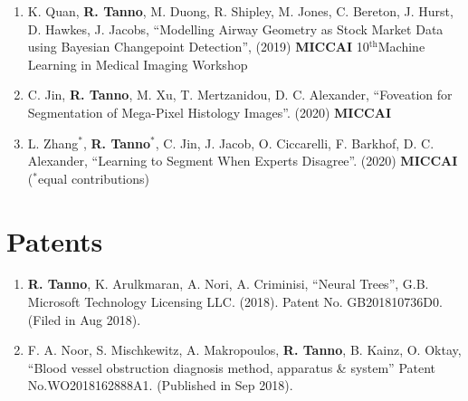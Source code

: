 \begin{enumerate}
	\item K. Quan, \textbf{R. Tanno}, M. Duong, R. Shipley, M. Jones, C. Bereton, J. Hurst, D. Hawkes, J. Jacobs, 	``Modelling Airway Geometry as Stock Market Data using Bayesian Changepoint Detection'', (2019) \textbf{MICCAI} 10$^{\text{th}}$Machine Learning in Medical Imaging Workshop

\item C. Jin, \textbf{R. Tanno}, M. Xu, T. Mertzanidou, D. C. Alexander, ``Foveation for Segmentation of Mega-Pixel Histology Images''.  (2020) \textbf{MICCAI} 

\item L. Zhang$^*$, \textbf{R. Tanno}$^*$,  C. Jin, J. Jacob, O. Ciccarelli, F. Barkhof, D. C. Alexander, ``Learning to Segment When Experts Disagree''.  (2020) \textbf{MICCAI} ($^*$equal contributions)

\end{enumerate}

\vspace{-2mm}
\section*{Patents}
\begin{enumerate}
	\item  \textbf{R. Tanno}, K. Arulkmaran, A. Nori, A. Criminisi, “Neural Trees”, G.B. Microsoft Technology Licensing LLC. (2018). Patent No. GB201810736D0. (Filed in Aug 2018).
	\item F. A. Noor, S. Mischkewitz, A. Makropoulos, \textbf{R. Tanno}, B. Kainz, O. Oktay, “Blood vessel obstruction diagnosis method, apparatus \& system”  Patent No.WO2018162888A1. (Published in Sep 2018).
	
\end{enumerate}

